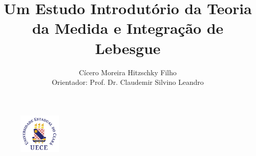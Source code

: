 \author{Cícero Moreira Hitzschky Filho \\ \vspace{0.5cm} {\footnotesize Orientador: Prof. Dr. Claudemir Silvino Leandro}}

\title{\textbf{Um Estudo Introdutório da Teoria da Medida e Integração de
Lebesgue}}
\subtitle{}


\date{}
\begin{frame}[plain]
	\maketitle\vspace{-1.5cm}
	\begin{figure}[ht!]
		\centering
		\includegraphics[width=2cm]{figuras/logo.png}
	\end{figure}
\end{frame}